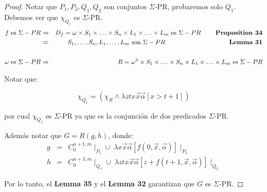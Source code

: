 \begin{proof}
    \PN Notar que $P_{1}, P_{2}, Q_{1}, Q_{2}$ son conjuntos $\Sigma$-PR, probaremos solo $Q_{1}$. Debemos ver que
    $\chi_{Q_{1}}$ es $\Sigma$-PR.
    \begin{eqnarray*}
      f \text{ es } \Sigma-PR &\Rightarrow& D_{f} = \omega \times S_{1} \times \dotsc \times S_{n} \times L_{1} \times
        \dotsc \times L_{m} \text{ es } \Sigma-PR \qquad\; \text{\textbf{Proposition 34}} \\
      &\Rightarrow& S_{1}, \dotsc, S_{n}, L_{1}, \dotsc, L_{m} \text{ son  } \Sigma-PR \qquad\qquad\qquad\qquad\qquad
        \text{\textbf{Lemma 31}} \\
      \\
      \omega \text{ es } \Sigma-PR &\Rightarrow& R = \omega^{3} \times S_{1} \times \dotsc \times S_{n} \times L_{1}
        \times \dotsc \times L_{m} \text{ es } \Sigma-PR
    \end{eqnarray*}

    \PN Notar que:

    \[
      \chi_{Q_{1}} = (\chi_{R} \wedge \lambda ztx\vec{x} \vec{\alpha}\left[x > t+1\right])
    \]

    \PN por cual $\chi_{Q_{1}}$ es $\Sigma$-PR ya que es la conjunción de dos predicados $\Sigma$-PR.

    \PN Además notar que $G = R(g, h)$, donde:
    \begin{eqnarray*}
      g &=& C_{0}^{n+1,m} \mid_{P_{1}} \cup \; \lambda x\vec{x}\vec{\alpha}\left[f(0,\vec{x},\vec{\alpha})\right]
        \mid_{P_{2}} \\
      h &=& C_{0}^{n+3,m} \mid_{Q_{1}} \cup \; \lambda ztx\vec{x}\vec{\alpha}\left[z+f(t+1,\vec{x},\vec{\alpha})\right]
        \mid_{Q_{2}}
    \end{eqnarray*}

    \PN Por lo tanto, el \textbf{Lemma 35} y el \textbf{Lemma 32} garantizan que $G$ es $\Sigma$-PR.
  \end{proof}

